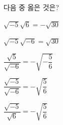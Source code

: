 다음 중 옳은 것은?
\begin{choicesii}{\rule[-3ex]{0pt}{8ex}$\sqrt{-5}\sqrt{6}=-\sqrt{30}$}{\rule[-3ex]{0pt}{8ex}$\sqrt{-5}\sqrt{-6}=\sqrt{30}$}{\rule[-3ex]{0pt}{8ex}$\dfrac{\sqrt{5}}{\sqrt{-6}}=-\sqrt{-\dfrac{5}{6}}$}{\rule[-3ex]{0pt}{8ex}$\dfrac{\sqrt{-5}}{\sqrt{-6}}=-\sqrt{\dfrac{5}{6}}$}{\rule[-3ex]{0pt}{8ex}$\dfrac{\sqrt{-5}}{\sqrt{6}}=-\sqrt{\dfrac{5}{6}}$}\end{choicesii}
